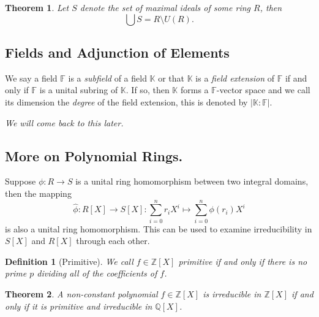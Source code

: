 \documentclass[
]{article}
\newtheorem{theorem}{Theorem}
\newtheorem{definition}{Definition}[theorem]
\begin{document}
\begin{theorem}
  Let \(S\) denote the set of maximal ideals of some ring \(R\), then 
  \[ \bigcup S = R \setminus U(R). \]
\end{theorem}

\hypertarget{fields-and-adjunction-of-elements}{%
\subsection{Fields and Adjunction of
Elements}\label{fields-and-adjunction-of-elements}}

We say a field \(\mathbb{F}\) is a \emph{subfield} of a field
\(\mathbb{K}\) or that \(\mathbb{K}\) is a \emph{field extension} of
\(\mathbb{F}\) if and only if \(\mathbb{F}\) is a unital subring of
\(\mathbb{K}\). If so, then \(\mathbb{K}\) forms a \(\mathbb{F}\)-vector
space and we call its dimension the \emph{degree} of the field
extension, this is denoted by
\(\left| \mathbb{K} : \mathbb{F} \right|\).

\emph{We will come back to this later.}

\hypertarget{more-on-polynomial-rings.}{%
\subsection{More on Polynomial Rings.}\label{more-on-polynomial-rings.}}

Suppose \(\phi : R \to S\) is a unital ring homomorphism between two
integral domains, then the mapping \[
  \hat{\phi} : R[X] \to S[X] : \sum_{i = 0}^n r_i X^i 
  \mapsto \sum_{i = 0}^n \phi(r_i) X^i
\] is also a unital ring homomorphism. This can be used to examine
irreducibility in \(S[X]\) and \(R[X]\) through each other.

\begin{definition}[Primitive]
  We call \(f \in \mathbb{Z}[X]\) \textit{primitive} if and only if there is no 
  prime \(p\) dividing all of the coefficients of \(f\).
\end{definition}

\begin{theorem}
  A non-constant polynomial \(f \in \mathbb{Z}[X]\) is irreducible in 
  \(\mathbb{Z}[X]\) if and only if it is primitive and irreducible in 
  \(\mathbb{Q}[X]\).
\end{theorem}
\end{document}
